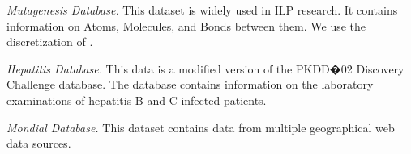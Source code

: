\documentclass[twoside,leqno,twocolumn]{article}
\begin{document}
{\em Mutagenesis Database.} This dataset is widely used in ILP research.
It contains information on Atoms, Molecules, and Bonds between them. We use the discretization of \cite{Schulte2012}.
%

{\em Hepatitis Database.} This data is a modified version of the PKDD�02 Discovery Challenge database.
The database contains information on the laboratory examinations of hepatitis B and C infected patients. 


{\em Mondial Database.} 
%
%
This dataset contains data from multiple geographical web data sources. %
\end{document}
